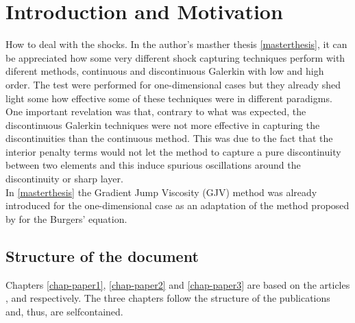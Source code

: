 \chapter{Introduction and Motivation}
\label{chap-intro}


How to deal with the shocks. In the {author's} masther thesis \ref{masterthesis}, it can be appreciated how some very different shock capturing techniques perform with diferent methods, continuous and discontinuous Galerkin with low and high order. The test were performed for one-dimensional cases but they already shed light some how effective some of these techniques were in different paradigms.\\

One important revelation was that, contrary to what was expected, the discontinuous Galerkin techniques were not more effective in capturing the discontinuities than the continuous method. This was due to the fact that the interior penalty terms would not let the method to capture a pure discontinuity between two elements and this induce spurious oscillations around the discontinuity or sharp layer.\\

In \ref{masterthesis} the Gradient Jump Viscosity (GJV) method was already introduced for the one-dimensional case as an adaptation of the method proposed by \cite{burman_nonlinear_2007} for the Burgers' equation.

\section{Structure of the document}
Chapters \ref{chap-paper1}, \ref{chap-paper2} and \ref{chap-paper3} are based on the  articles \cite{badia_stabilized_2012}, \cite{badia_discrete_2015} and \cite{paper3} respectively. The three chapters follow the structure of the publications and, thus, are selfcontained.